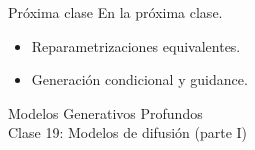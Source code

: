 \documentclass{beamer}
\begin{document}
\begin{frame}{Próxima clase}
    En la próxima clase.
    \begin{itemize}
        \item Reparametrizaciones equivalentes.
        \item Generación condicional y guidance.
    \end{itemize}
\end{frame}

\begin{frame}
    \centering
    \Large{Modelos Generativos Profundos}\\
    \large{Clase 19: Modelos de difusión (parte I)}
\end{frame}
\end{document}
